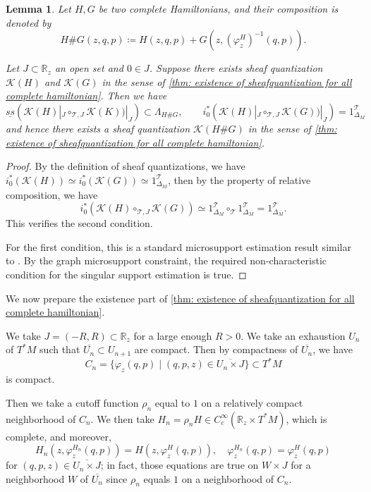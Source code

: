 \documentclass[11pt]{amsart}
\numberwithin{equation}{section}
\theoremstyle{plain}
\newtheorem{Lemma}[lemma]{Lemma}
\theoremstyle{definition}
\theoremstyle{remark}
\newcommand{\bR} { {\mathbb{R}}}
\newcommand{\cK} { {\mathcal{K}}}
\newcommand{\sT} { {\mathscr{T}}}
\begin{document}
\begin{Lemma}\label{lemma: relative compisition estimation}Let $H,G$ be two complete Hamiltonians, and their composition is denoted by
\[H \# G (z,q,p) \coloneqq H(z,q,p)+G(z,(\varphi^H_z)^{-1}(q,p)).\]

Let $J\subset \bR_z$ an open set and $0 \in J$. Suppose there exists sheaf quantization $\cK(H)$ and $\cK(G)$ in the sense of \autoref{thm: existence of sheafquantization for all complete hamiltonian}.
Then we have 
\[\underline{ss}(\cK(H)|_J\circ_{\sT,J} \cK(K))|_J)\subset \Lambda_{H \# G},\qquad i_0^*(\cK(H)|_J\circ_{\sT,J} \cK(G))|_J)=1_{\Delta_{M}}^\sT\]   
and hence there exists a sheaf quantization $\cK(H \# G)$ in the sense of \autoref{thm: existence of sheafquantization for all complete hamiltonian}.
\end{Lemma}
\begin{proof}By the definition of sheaf quantizations, we have $i_0^*(\cK(H))\simeq i_0^*(\cK(G))\simeq 1_{\Delta_{M}}^\sT$, then by the property of relative composition, we have
  \[i_0^*(\cK(H)\circ_{\sT,J} \cK(G))\simeq 1_{\Delta_{M}}^\sT \circ_{\sT } 1_{\Delta_{M}}^\sT=1_{\Delta_{M}}^\sT.\] 
  This verifies the second condition.

  For the first condition, this is a standard microsupport estimation result similar to \cite[Equation (1.12)]{GKS2012}. By the graph microsupport constraint, the required non-characteristic condition for the singular support estimation \cite[Equation (1.14)]{GKS2012} is true. 
\end{proof}

We now prepare the existence part of \autoref{thm: existence of sheafquantization for all complete hamiltonian}.

We take $J=(-R,R)\subset \bR_z$ for a large enough $R > 0$. We take an exhaustion $U_n$ of $T^*M$ such that $\overline{U_n}\subset U_{n+1}$ are compact. Then by compactness of $\overline{U_n}$, we have
\[C_n=\{\varphi_z(q,p)\mid (q,p,z)\in \overline{U_n\times J}\} \subset T^*M\]
is compact. 

Then we take a cutoff function $\rho_n$ equal to $1$ on a relatively compact neighborhood of $C_n$. We then take $H_n=\rho_n H \in C_c^\infty(\bR_z\times T^*M)$, which is complete, and moreover, 
\[H_n(z,\varphi_{z}^{H_n}(q,p))=H(z,\varphi_{z}^{H}(q,p)),\quad \varphi_{z}^{H_n}(q,p)=\varphi_{z}^{H}(q,p)\]
for $(q,p,z)\in \overline{U_n\times J}$; in fact, those equations are true on $ W\times   J$ for  a neighborhood $W$ of $\overline{U_n}$ since $\rho_n$ equals $1$ on a neighborhood of $C_n$.
\end{document}
